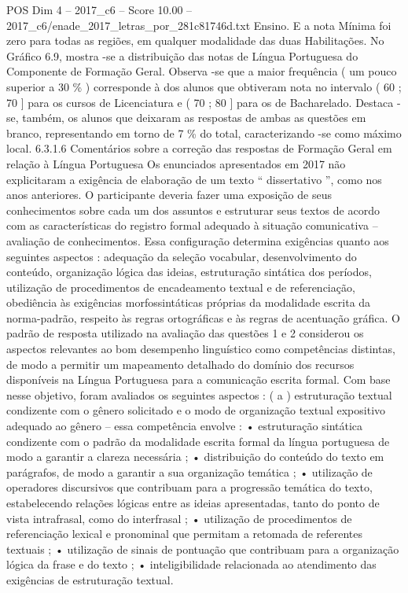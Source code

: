 \begin{textsample}{POS Dim 4 – 2017\_c6 – Score 10.00 – 2017\_c6/enade\_2017\_letras\_por\_281c81746d.txt}
Ensino.
E a nota Mínima foi zero para todas as regiões, em qualquer modalidade das duas Habilitações.
No Gráfico 6.9, mostra -se a distribuição das notas de Língua Portuguesa do Componente de Formação Geral.
Observa -se que a maior frequência ( um pouco superior a 30 \% ) corresponde à dos alunos que obtiveram nota no intervalo ( 60 ; 70 ] para os cursos de Licenciatura e ( 70 ; 80 ] para os de Bacharelado.
Destaca -se, também, os alunos que deixaram as respostas de ambas as questões em branco, representando em torno de 7 \% do total, caracterizando -se como máximo local. 6.3.1.6 Comentários sobre a correção das respostas de Formação Geral em relação à Língua Portuguesa Os enunciados apresentados em 2017 não explicitaram a exigência de elaboração de um texto “ dissertativo ”, como nos anos anteriores.
O participante deveria fazer uma exposição de seus conhecimentos sobre cada um dos assuntos e estruturar seus textos de acordo com as características do registro formal adequado à situação comunicativa – avaliação de conhecimentos.
Essa configuração determina exigências quanto aos seguintes aspectos : adequação da seleção vocabular, desenvolvimento do conteúdo, organização lógica das ideias, estruturação sintática dos períodos, utilização de procedimentos de encadeamento textual e de referenciação, obediência às exigências morfossintáticas próprias da modalidade escrita da norma-padrão, respeito às regras ortográficas e às regras de acentuação gráfica.
O padrão de resposta utilizado na avaliação das questões 1 e 2 considerou os aspectos relevantes ao bom desempenho linguístico como competências distintas, de modo a permitir um mapeamento detalhado do domínio dos recursos disponíveis na Língua Portuguesa para a comunicação escrita formal.
Com base nesse objetivo, foram avaliados os seguintes aspectos : ( a ) estruturação textual condizente com o gênero solicitado e o modo de organização textual expositivo adequado ao gênero – essa competência envolve : • estruturação sintática condizente com o padrão da modalidade escrita formal da língua portuguesa de modo a garantir a clareza necessária ; • distribuição do conteúdo do texto em parágrafos, de modo a garantir a sua organização temática ; • utilização de operadores discursivos que contribuam para a progressão temática do texto, estabelecendo relações lógicas entre as ideias apresentadas, tanto do ponto de vista intrafrasal, como do interfrasal ; • utilização de procedimentos de referenciação lexical e pronominal que permitam a retomada de referentes textuais ; • utilização de sinais de pontuação que contribuam para a organização lógica da frase e do texto ; • inteligibilidade relacionada ao atendimento das exigências de estruturação textual.

\end{textsample}

